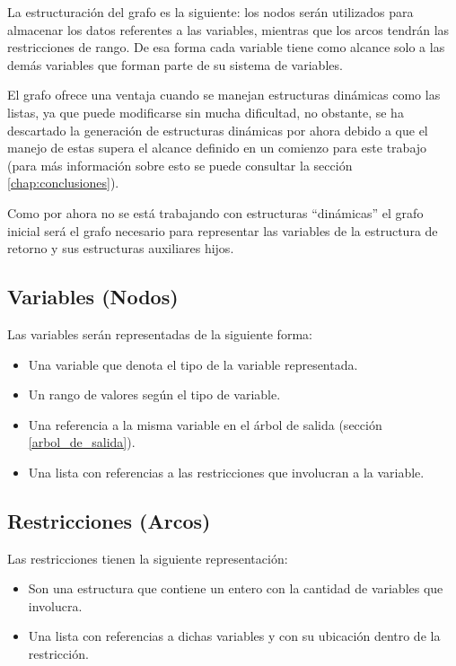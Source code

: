 La estructuración del grafo es la siguiente: los nodos serán utilizados para almacenar 
los datos referentes a las variables, mientras que los arcos tendrán las 
restricciones de rango. De esa forma cada variable tiene como alcance solo a las 
demás variables que forman parte de su sistema de variables.

El grafo ofrece una ventaja cuando se manejan estructuras dinámicas como las 
listas, ya que puede modificarse sin mucha dificultad, no obstante, se ha 
descartado la generación de estructuras dinámicas por ahora debido a que el
manejo de estas supera el alcance definido en un comienzo para este trabajo 
(para más información sobre esto se puede consultar la sección \ref{chap:conclusiones}).

Como por ahora no se está trabajando con estructuras ``dinámicas'' el 
grafo inicial será el grafo necesario para representar las variables de la 
estructura de retorno y sus estructuras auxiliares hijos.

\subsection{Variables (Nodos)}

Las variables serán representadas de la siguiente forma:

\begin{itemize}
 \item Una variable que denota el tipo de la variable representada.
 \item Un rango de valores según el tipo de variable.
 \item Una referencia a la misma variable en el árbol de salida (sección \ref{arbol_de_salida}).
 \item Una lista con referencias a las restricciones que involucran a la variable.
\end{itemize}

\subsection{Restricciones (Arcos)}

Las restricciones tienen la siguiente representación:

\begin{itemize}
 \item {Son una estructura que contiene un entero con la cantidad de variables 
  que involucra.}
 \item {Una lista con referencias a dichas variables y con su ubicación dentro 
  de la restricción.}
\end{itemize}

